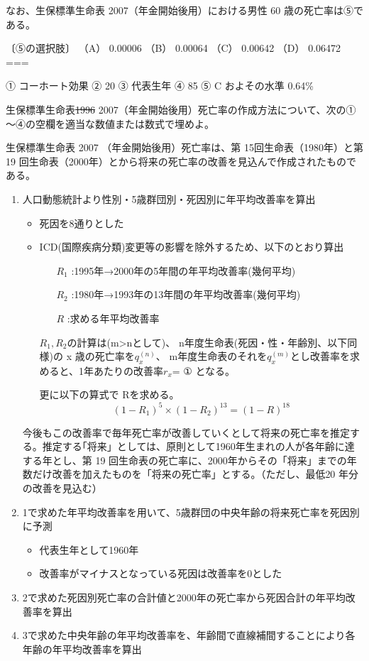 \documentclass[report,gutter=10mm,fore-edge=10mm,uplatex,dvipdfmx]{jlreq}
\begin{document}
なお、生保標準生命表 2007（年金開始後用）における男性 60 歳の死亡率は⑤である。


〔⑤の選択肢〕
（A） 0.00006 （B） 0.00064
（C） 0.00642
（D） 0.06472
===


① コーホート効果 ② 20 ③ 代表生年 ④ 85 ⑤ C およその水準 0.64\%


生保標準生命表\sout{1996} 2007（年金開始後用）死亡率の作成方法について、次の①～④の空欄を適当な数値または数式で埋めよ。

生保標準生命表 2007 （年金開始後用）死亡率は、第 15回生命表（1980年）と第 19 回生命表（2000年）とから将来の死亡率の改善を見込んで作成されたものである。
\begin{enumerate}
 \item 人口動態統計より性別・5歳群団別・死因別に年平均改善率を算出
\begin{itemize}
 \item 死因を8通りとした
 \item ICD(国際疾病分類)変更等の影響を除外するため、以下のとおり算出
\begin{itemize}
 \item [$R_1$]:1995年→2000年の5年間の年平均改善率(幾何平均)
 \item [$R_2$]:1980年→1993年の13年間の年平均改善率(幾何平均)
 \item [$R$]:求める年平均改善率
\end{itemize}

$R_1,R_2$の計算は(m>nとして)、
n年度生命表(死因・性・年齢別、以下同様)の x 歳の死亡率を\(q_x^{(n)}\)、
m年度生命表のそれを\(q_x^{(m)}\)とし改善率を求めると、1年あたりの改善率\(r_x\)= ① となる。

更に以下の算式で Rを求める。
$$
(1-R_1)^5\times(1-R_2)^{13} = (1-R)^{18}
$$

\end{itemize}

今後もこの改善率で毎年死亡率が改善していくとして将来の死亡率を推定する。推定する｢将来」としては、原則として1960年生まれの人が各年齢に達する年とし、第 19 回生命表の死亡率に、2000年からその「将来」までの年数だけ改善を加えたものを「将来の死亡率」とする。（ただし、最低20 年分 の改善を見込む）

 \item 1で求めた年平均改善率を用いて、5歳群団の中央年齢の将来死亡率を死因別に予測
\begin{itemize}
 \item 代表生年として1960年
 \item 改善率がマイナスとなっている死因は改善率を0とした
\end{itemize}
 \item 2で求めた死因別死亡率の合計値と2000年の死亡率から死因合計の年平均改善率を算出
 \item 3で求めた中央年齢の年平均改善率を、年齢間で直線補間することにより各年齢の年平均改善率を算出
\end{enumerate}
\end{document}
